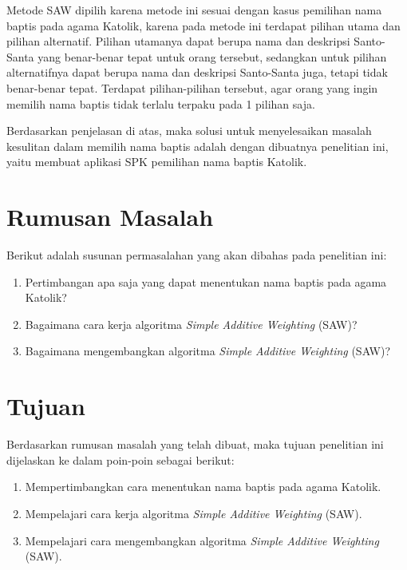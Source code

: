 Metode SAW dipilih karena metode ini sesuai dengan kasus pemilihan nama baptis pada agama Katolik, karena pada metode ini terdapat pilihan utama dan pilihan alternatif. Pilihan utamanya dapat berupa nama dan deskripsi Santo-Santa yang benar-benar tepat untuk orang tersebut, sedangkan untuk pilihan alternatifnya dapat berupa nama dan deskripsi Santo-Santa juga, tetapi tidak benar-benar tepat. Terdapat pilihan-pilihan tersebut, agar orang yang ingin memilih nama baptis tidak terlalu terpaku pada 1 pilihan saja.

Berdasarkan penjelasan di atas, maka solusi untuk menyelesaikan masalah kesulitan dalam memilih nama
baptis adalah dengan dibuatnya penelitian ini, yaitu membuat aplikasi SPK pemilihan nama baptis Katolik.

\section{Rumusan Masalah}
\label{sec:rumusan_masalah}
Berikut adalah susunan permasalahan yang akan dibahas pada penelitian ini:
	\begin{enumerate}
		\item Pertimbangan apa saja yang dapat menentukan nama baptis pada agama Katolik?
		\item Bagaimana cara kerja algoritma \textit{Simple Additive Weighting} (SAW)?
		\item Bagaimana mengembangkan algoritma \textit{Simple Additive Weighting} (SAW)?
	\end{enumerate}
	
\section{Tujuan}
\label{sec:tujuan}
Berdasarkan rumusan masalah yang telah dibuat, maka tujuan penelitian ini dijelaskan ke dalam poin-poin sebagai berikut:
	\begin{enumerate}
		\item Mempertimbangkan cara menentukan nama baptis pada agama Katolik.
		\item Mempelajari cara kerja algoritma \textit{Simple Additive Weighting} (SAW).
		\item Mempelajari cara mengembangkan algoritma \textit{Simple Additive Weighting} (SAW).
	\end{enumerate}
	
